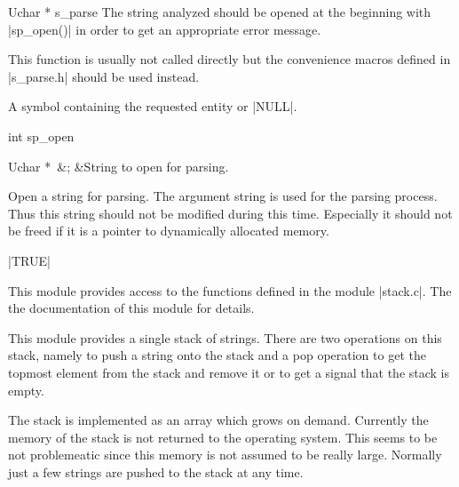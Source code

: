 \begin{Function}{Uchar * }{s\_parse}
  The string analyzed should be opened at the beginning
  with |sp_open()| in order to get an appropriate error
  message. 
  
  This function is usually not called directly but the
  convenience macros defined in |s_parse.h| should be
  used instead.
  \begin{Result}
    A symbol containing the requested entity or |NULL|.
  \end{Result}
\end{Function}
\begin{Function}{int }{sp\_open}
  \begin{Arguments}
    Uchar *\ 	&;	&String to open for parsing.
  \end{Arguments}%
  Open a string for parsing. The argument string is used
  for the parsing process.  Thus this string should not
  be modified during this time.  Especially it should
  not be freed if it is a pointer to dynamically
  allocated memory.
  \begin{Result}
    |TRUE|
  \end{Result}
\end{Function}


This module provides access to the functions defined in the
module |stack.c|. The the documentation of this module for
details.



This module provides a single stack of strings. There are two
operations on this stack, namely to push a string onto the
stack and a pop operation to get the topmost element from the
stack and remove it or to get a signal that the stack is
empty. 

The stack is implemented as an array which grows on demand.
Currently the memory of the stack is not returned to the
operating system. This seems to be not problemeatic since this
memory is not assumed to be really large. Normally just a few
strings are pushed to the stack at any time.


